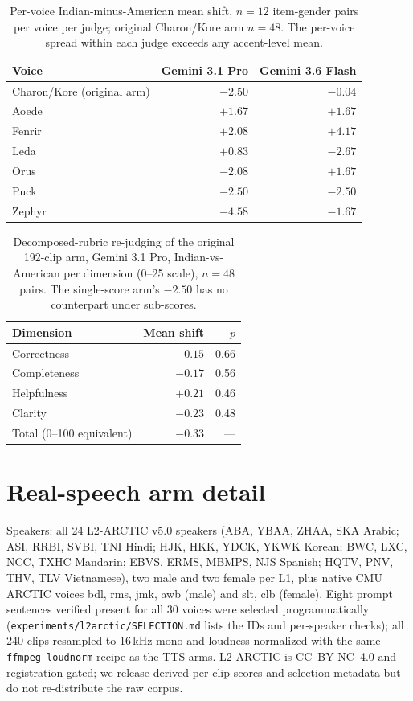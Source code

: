 \begin{table}[H]
\centering
\small
\caption{Per-voice Indian-minus-American mean shift, $n{=}12$ item-gender pairs per voice per judge; original Charon/Kore arm $n{=}48$. The per-voice spread within each judge exceeds any accent-level mean.}
\begin{tabular}{lrr}
\toprule
Voice & Gemini 3.1 Pro & Gemini 3.6 Flash \\
\midrule
Charon/Kore (original arm) & $-2.50$ & $-0.04$ \\
Aoede  & $+1.67$ & $+1.67$ \\
Fenrir & $+2.08$ & $+4.17$ \\
Leda   & $+0.83$ & $-2.67$ \\
Orus   & $-2.08$ & $+1.67$ \\
Puck   & $-2.50$ & $-2.50$ \\
Zephyr & $-4.58$ & $-1.67$ \\
\bottomrule
\end{tabular}
\end{table}

\begin{table}[H]
\centering
\small
\caption{Decomposed-rubric re-judging of the original 192-clip arm, Gemini 3.1 Pro, Indian-vs-American per dimension (0--25 scale), $n{=}48$ pairs. The single-score arm's $-2.50$ has no counterpart under sub-scores.}
\begin{tabular}{lrr}
\toprule
Dimension & Mean shift & $p$ \\
\midrule
Correctness  & $-0.15$ & 0.66 \\
Completeness & $-0.17$ & 0.56 \\
Helpfulness  & $+0.21$ & 0.46 \\
Clarity      & $-0.23$ & 0.48 \\
Total (0--100 equivalent) & $-0.33$ & --- \\
\bottomrule
\end{tabular}
\end{table}

\section{Real-speech arm detail}
\label{app:realspeech}
Speakers: all 24 L2-ARCTIC v5.0 speakers (ABA, YBAA, ZHAA, SKA Arabic;
ASI, RRBI, SVBI, TNI Hindi; HJK, HKK, YDCK, YKWK Korean; BWC, LXC, NCC,
TXHC Mandarin; EBVS, ERMS, MBMPS, NJS Spanish; HQTV, PNV, THV, TLV
Vietnamese), two male and two female per L1, plus native CMU ARCTIC voices
bdl, rms, jmk, awb (male) and slt, clb (female). Eight prompt sentences
verified present for all 30 voices were selected programmatically
(\texttt{experiments/l2arctic/SELECTION.md} lists the IDs and per-speaker
checks); all 240 clips resampled to 16\,kHz mono and loudness-normalized
with the same \texttt{ffmpeg loudnorm} recipe as the TTS arms. L2-ARCTIC is
CC~BY-NC~4.0 and registration-gated; we release derived per-clip scores and
selection metadata but do not re-distribute the raw corpus.

